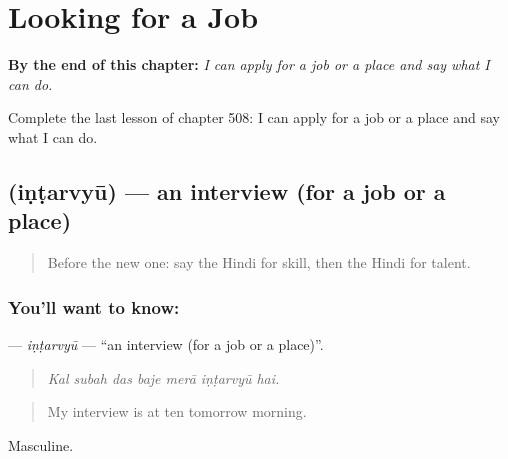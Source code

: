 
\chapter{Looking for a Job}
\label{ch:hi-looking-for-a-job}

\begin{chapteropening}
\textbf{By the end of this chapter:} \emph{I can apply for a job or a place and say what I can do.}

Complete the last lesson of chapter 508: I can apply for a job or a place and say what I can do.
\end{chapteropening}

\section[\texorpdfstring{\hi{इंटरव्यू} (iṇṭarvyū)}{इंटरव्यू (iṇṭarvyū)}]{ (iṇṭarvyū) — an interview (for a job or a place)}

\label{lesson:HI-C508-intarvyu}



\begin{quote}
Before the new one: say the Hindi for skill, then the Hindi for talent.
\end{quote}

\subsection*{You'll want to know: }
\textbf{} — \emph{iṇṭarvyū} — \textquotedblleft{}an interview (for a job or a place)\textquotedblright{}.

\begin{quote}
      
\end{quote}

\begin{quote}
\emph{Kal subah das baje merā iṇṭarvyū hai.}
\end{quote}

\begin{quote}
My interview is at ten tomorrow morning.
\end{quote}

Masculine.

